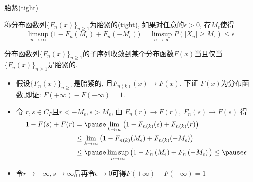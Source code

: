 \begin{frame}{胎紧(tight)}
\begin{defi}
  称分布函数列$\{F_n(x)\}_{n\geq 1}$为胎紧的(tight), 如果对任意的$\epsilon>0$, 存$M_{\epsilon}$使得
  \[
\limsup _{n \rightarrow \infty} \big(1-F_{n}\left(M_{\epsilon}\right)+F_{n}\left(-M_{\epsilon}\right) \big)=\limsup _{n \rightarrow \infty}P(|X_n|\geq M_{\epsilon})\leq \epsilon
\]
\end{defi}
\pause
\vspace{-0.5cm}
\begin{thm}
	分布函数列$\{F_n(x)\}_{n\geq 1}$的子序列收敛到某个分布函数$F(x)$当且仅当$\{F_n(x)\}_{n\geq 1}$是胎紧的.
 \end{thm}\pause

\zheng
\begin{itemize}[<+-|alert@+>]
\item 假设$\{F_n(x)\}_{n\geq 1}$是胎紧的, 且\( F_{n(k)}(x) \rightarrow F(x) \). 下证 $F(x)$为分布函数,\pause  即证: $F(+\infty)-F(-\infty)=1$.
\item 令 $r, s\in C_F$且\( r<-M_{\epsilon}, s>M_{\epsilon} \), 由
\(F_{n}(r) \rightarrow F(r), \ F_{n}(s) \rightarrow F(s) \)
得 \pause %
\[
\begin{aligned}
1-F(s)+F(r)  &=\pause \lim _{k \rightarrow \infty} \big(1-F_{n(k)}(s)+F_{n(k)}(r) \big)\\
& \leq\lim _{k \rightarrow \infty} \big(1-F_{n(k)}(M_{\epsilon})+F_{n(k)}(-M_{\epsilon}) \big)\\
&\leq \pause \limsup _{n \rightarrow \infty} \big(1-F_{n}\left(M_{\epsilon}\right)+F_{n}\left(-M_{\epsilon}\right)\big) \leq \pause \epsilon
\end{aligned}
\]
\item 令$r\rightarrow-\infty, s\rightarrow\infty$后再令$\epsilon\rightarrow 0$可得$F(+\infty)-F(-\infty)=1$%
\end{itemize}


\end{frame}

